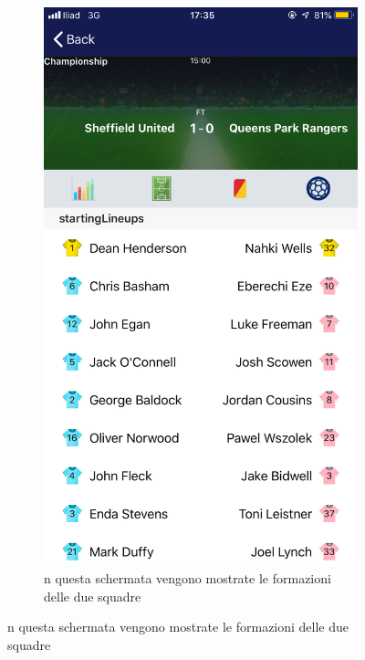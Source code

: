 \documentclass[numbers=noenddot, 12pt, a4paper, oneside]{scrbook}
\begin{document}
\begin{figure}[H]
\begin{subfigure}{.5\textwidth}
		\includegraphics[width=.8\linewidth]{images/Screen/Formazione}
		\caption{n questa schermata vengono mostrate le formazioni delle due squadre}
	\end{subfigure}
\end{figure}
\end{document}
